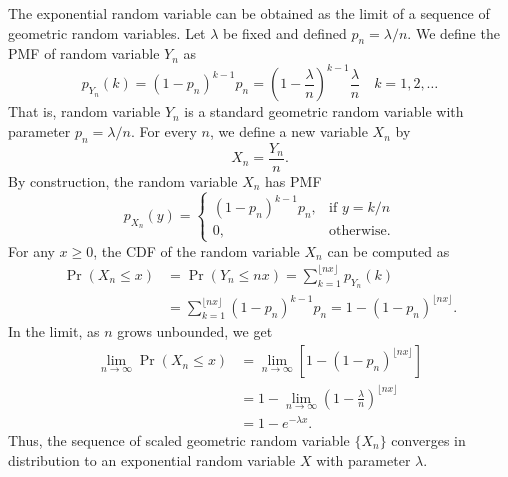 The exponential random variable can be obtained as the limit of a sequence of geometric random variables.
Let $\lambda$ be fixed and defined $p_n = \lambda/n$.
We define the PMF of random variable $Y_n$ as
\begin{equation*}
p_{Y_n} (k) = (1 - p_n)^{k-1} p_n
= \left( 1 - \frac{\lambda}{n} \right)^{k-1} \frac{\lambda}{n}
\quad k = 1, 2, \ldots
\end{equation*}
That is, random variable $Y_n$ is a standard geometric random variable with parameter $p_n = \lambda/n$.
For every $n$, we define a new variable $X_n$ by
\begin{equation*}
X_n = \frac{Y_n}{n}.
\end{equation*}
By construction, the random variable $X_n$ has PMF
\begin{equation*}
p_{X_n} (y) = \left\{ \begin{array}{ll}
(1 - p_n)^{k-1} p_n, & \text{if }y = k/n \\
0, & \text{otherwise} .
\end{array} \right.
\end{equation*}
For any $x \geq 0$, the CDF of the random variable $X_n$ can be computed as
\begin{equation*}
\begin{split}
\Pr (X_n \leq x)
&= \Pr (Y_n \leq n x)
= \sum_{k = 1}^{\lfloor n x \rfloor} p_{Y_n} (k) \\
&= \sum_{k = 1}^{\lfloor n x \rfloor} (1 - p_n)^{k-1} p_n
= 1 - (1 - p_n)^{\lfloor n x \rfloor} .
\end{split}
\end{equation*}
In the limit, as $n$ grows unbounded, we get
\begin{equation*}
\begin{split}
\lim_{n \rightarrow \infty} \Pr (X_n \leq x)
&= \lim_{n \rightarrow \infty} \left[ 1 - (1 - p_n)^{\lfloor n x \rfloor} \right] \\
&= 1 - \lim_{n \rightarrow \infty}
\left( 1 - \frac{\lambda}{n} \right)^{\lfloor n x \rfloor} \\
&= 1 - e^{- \lambda x} .
\end{split}
\end{equation*}
Thus, the sequence of scaled geometric random variable $\{ X_n \}$ converges in distribution to an exponential random variable $X$ with parameter $\lambda$.

